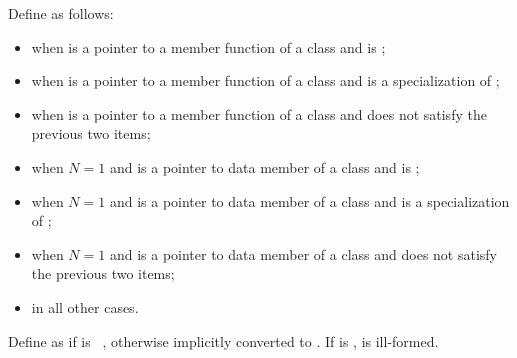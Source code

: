 \pnum
{}%
%
Define  as follows:
\begin{itemize}
\item {} when  is a pointer to a
member function of a class 
and
 is ;

\item {} when  is a pointer to a
member function of a class 
and  is a specialization of ;

\item {} when  is a pointer to a
member function of a class 
and  does not satisfy the previous two items;

\item {} when $N = 1$ and  is a pointer to
data member of a class 
and
 is ;

\item {} when $N = 1$ and  is a pointer to
data member of a class 
and  is a specialization of ;

\item {} when $N = 1$ and  is a pointer to
data member of a class 
and  does not satisfy the previous two items;

\item {} in all other cases.
\end{itemize}

\pnum
{}%
Define  as
if  is \cv{}~, otherwise
 implicitly converted
to .
If
is ,
is ill-formed.

